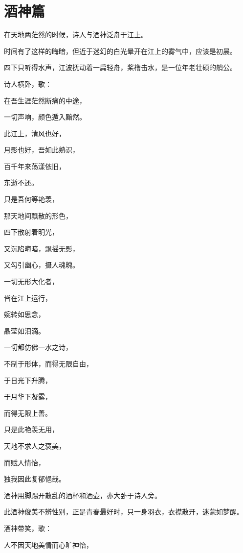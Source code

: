 \documentclass[UTF8]{article}
\begin{document}
\section{酒神篇}
\par 在天地两茫然的时候，诗人与酒神泛舟于江上。
\par 时间有了这样的晦暗，但近于迷幻的白光晕开在江上的雾气中，应该是初晨。
\par 四下只听得水声，江波抚动着一扁轻舟，桨橹击水，是一位年老壮硕的艄公。
\\[0.6cm]
\par 诗人横卧，歌：
\\[0.6cm]
\par 在吾生涯茫然断痛的中途，
\par 一切声响，颜色遁入黯然。
\par 此江上，清风也好，
\par 月影也好，吾如此熟识，
\par 百千年来荡漾依旧，
\par 东逝不还。
\par 只是吾何等艳羡，
\par 那天地间飘散的形色，
\par 四下散射着明光，
\par 又沉陷晦暗，飘摇无影，
\par 又勾引幽心，摄人魂魄。
\par 一切无形大化者，
\par 皆在江上运行，
\par 婉转如思念，
\par 晶莹如泪滴。
\par 一切都仿佛一水之诗，
\par 不制于形体，而得无限自由，
\par 于日光下升腾，
\par 于月华下凝露，
\par 而得无限上善。
\par 只是此艳羡无用，
\par 天地不求人之褒美，
\par 而赋人情怡，
\par 独我因此复郁悒哉。
\\[0.6cm]
\par 酒神用脚踢开散乱的酒杯和酒壶，亦大卧于诗人旁。
\par 此酒神俊美不辨性别，正是青春最好时，只一身羽衣，衣襟散开，迷蒙如梦醒。
\\[0.6cm]
\par 酒神带笑，歌：
\\[0.6cm]
\par 人不因天地美情而心旷神怡，
\end{document}
